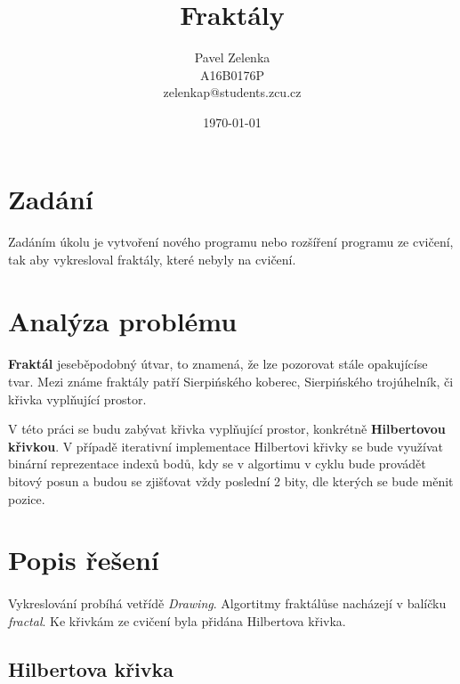 \documentclass[12pt]{scrartcl}
\author{Pavel Zelenka\\A16B0176P\\zelenkap@students.zcu.cz}
\date{\today}
\title{Fraktály}
\begin{document}
\maketitle
{}
\newpage
{}
\newpage
\section{Zadání}
	
\paragraph{}
Zadáním úkolu je vytvoření nového programu nebo rozšíření programu ze cvičení, tak aby vykresloval fraktály, které nebyly na cvičení.

\section{Analýza problému}

\paragraph{}
\textbf{Fraktál} je\nobreakspace seběpodobný útvar, to znamená, že lze pozorovat stále opakující\nobreakspace se tvar. Mezi známe fraktály patří Sierpińského koberec, Sierpińského trojúhelník, či křivka vyplňující prostor.

V této práci se budu zabývat křivka vyplňující prostor, konkrétně \textbf{Hilbertovou křivkou}. V případě iterativní implementace Hilbertovi křivky se bude využívat binární reprezentace indexů bodů, kdy se v algortimu v cyklu bude provádět bitový posun a budou se zjišťovat vždy poslední 2 bity, dle kterých se bude měnit pozice.

\section{Popis řešení}

\paragraph{}
Vykreslování probíhá ve\nobreakspace třídě \emph{Drawing}. Algortitmy fraktálů\nobreakspace se nacházejí v balíčku \emph{fractal}. Ke křivkám ze cvičení byla přidána Hilbertova křivka.

\newpage
\subsection{Hilbertova křivka}
\end{document}
